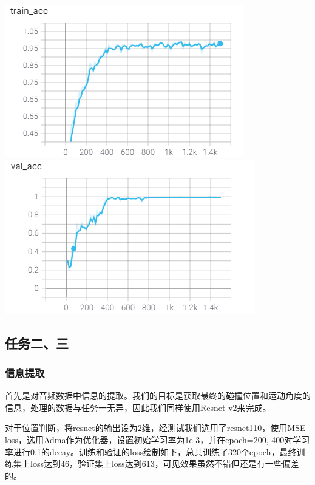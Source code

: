\documentclass[a4paper]{ctexart}
\begin{document}
\centerline{\includegraphics[scale=0.65]{images/audio_train.png}\includegraphics[scale=0.65]{images/audio_cal.png}}
\subsection{任务二、三}

\subsubsection{信息提取}
首先是对音频数据中信息的提取。我们的目标是获取最终的碰撞位置和运动角度的信息，处理的数据与任务一无异，因此我们同样使用Resnet-v2来完成。

对于位置判断，将resnet的输出设为2维，经测试我们选用了resnet110，使用MSE loss，选用Adma作为优化器，设置初始学习率为1e-3，并在epoch=200, 400对学习率进行0.1的decay。训练和验证的loss绘制如下，总共训练了320个epoch，最终训练集上loss达到46，验证集上loss达到613，可见效果虽然不错但还是有一些偏差的。
\end{document}
